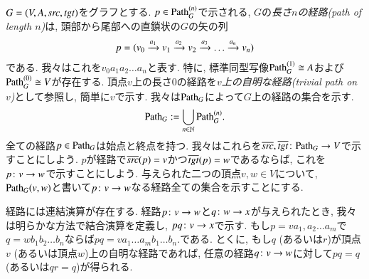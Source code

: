 \begin{definition}\label{def:paths in graph}


$G=(V,A,\operatorname{\mathit{src}},\operatorname{\mathit{tgt}})$をグラフとする. $p\in\Path_G^{(n)}$で示される, $G$の\emph{長さ$n$の経路(path of length $n$)}は, 頭部から尾部への直鎖状の$G$の矢の列\begin{align}\label{dia:path}p=(v_0\xrightarrow{a_1}v_1\xrightarrow{a_2}v_2\xrightarrow{a_3}\ldots\xrightarrow{a_n}v_n)\end{align}である. 我々はこれを$v_0 a_1 a_2 \ldots a_n$と表す. 特に, 標準同型写像$\Path_G^{(1)}\iso A$および$\Path_G^{(0)}\iso V$が存在する. 頂点$v$上の長さ0の経路を\emph{$v$上の自明な経路(trivial path on $v$)}として参照し, 簡単に$v$で示す. 我々は$\Path_G$によって$G$上の経路の集合を示す. $$\Path_G:=\bigcup_{n\in\NN}\Path_G^{(n)}.$$ 全ての経路$p\in\Path_G$は始点と終点を持つ. 我々はこれらを$\ol{\src},\ol{\tgt}\taking\Path_G\to V$で示すことにしよう. $p$が経路で$\overline{\operatorname{\mathit{src}}}(p)=v$かつ$\overline{\operatorname{\mathit{tgt}}}(p)=w$であるならば, これを$p\colon v\rightarrow w$で示すことにしよう. 与えられた二つの頂点$v,w\in V$について, $\Path_G(v,w)$と書いて$p\colon v\rightarrow w$なる経路全ての集合を示すことにする.


経路には連結演算が存在する. 経路$p\colon v\rightarrow w$と$q\colon w\rightarrow x$が与えられたとき, 我々は明らかな方法で結合演算を定義し, $p q\colon v\rightarrow x$で示す. もし$p=va_1,a_2\ldots a_m$で$q= wb_1b_2\ldots b_n$ならば$pq=va_1\ldots a_mb_1\ldots b_n.$である. とくに, もし$q$ (あるいは$r$)が頂点$v$ (あるいは頂点$w$)上の自明な経路であれば, 任意の経路$q\colon v\rightarrow w$に対して$pq=q$ (あるいは$qr=q$)が得られる.

\end{definition}

